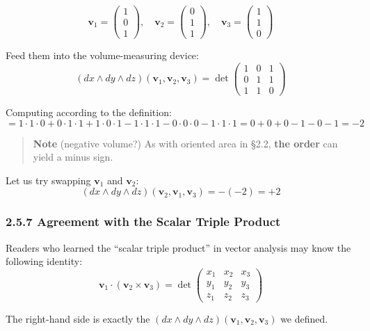 \[\mathbf{v}_1 = \begin{pmatrix}1\\0\\1\end{pmatrix}, \quad \mathbf{v}_2 = \begin{pmatrix}0\\1\\1\end{pmatrix}, \quad \mathbf{v}_3 = \begin{pmatrix}1\\1\\0\end{pmatrix}\]

Feed them into the volume-measuring device:
\[(dx \wedge dy \wedge dz)(\mathbf{v}_1, \mathbf{v}_2, \mathbf{v}_3) = \det\begin{pmatrix}1 & 0 & 1 \\ 0 & 1 & 1 \\ 1 & 1 & 0\end{pmatrix}\]

Computing according to the definition:
\[= 1\cdot1\cdot0 + 0\cdot1\cdot1 + 1\cdot0\cdot1 - 1\cdot1\cdot1 - 0\cdot0\cdot0 - 1\cdot1\cdot1 = 0 + 0 + 0 - 1 - 0 - 1 = -2\]

\begin{quote}
\textbf{Note} (negative volume?) As with oriented area in §2.2,
\textbf{the order} can yield a minus sign.
\end{quote}

Let us try swapping \(\mathbf{v}_1\) and \(\mathbf{v}_2\):
\[(dx \wedge dy \wedge dz)(\mathbf{v}_2, \mathbf{v}_1, \mathbf{v}_3) = -(-2) = +2\]

\hypertarget{agreement-with-the-scalar-triple-product}{%
\subsubsection{2.5.7 Agreement with the Scalar Triple
Product}\label{agreement-with-the-scalar-triple-product}}

Readers who learned the ``scalar triple product'' in vector analysis may
know the following identity:
\[\mathbf{v}_1 \cdot (\mathbf{v}_2 \times \mathbf{v}_3) = \det\begin{pmatrix}x_1 & x_2 & x_3 \\ y_1 & y_2 & y_3 \\ z_1 & z_2 & z_3\end{pmatrix}\]

The right-hand side is exactly the
\((dx \wedge dy \wedge dz)(\mathbf{v}_1, \mathbf{v}_2, \mathbf{v}_3)\)
we defined.

